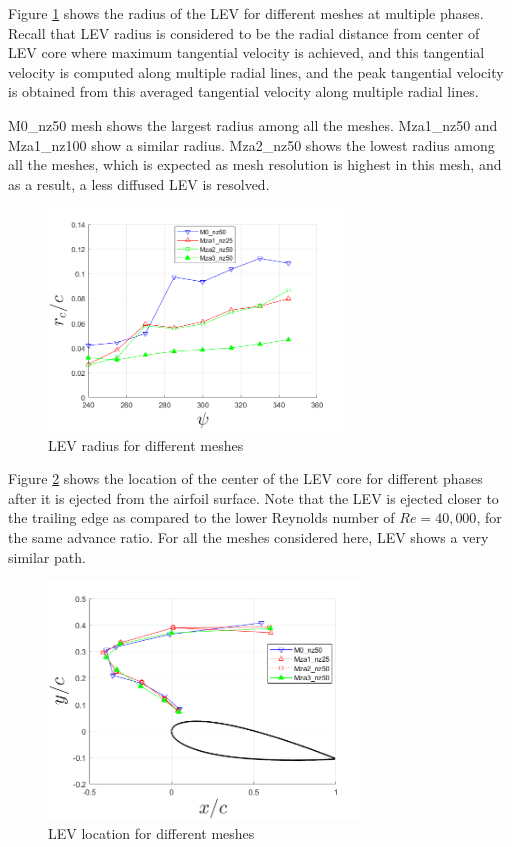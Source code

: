 Figure \ref{fig:zonal_LEV_radius_Re200k} shows the radius of the LEV for different meshes at multiple phases.
Recall that LEV radius is considered to be
the radial distance from center of LEV core where maximum tangential velocity is achieved, and this tangential velocity is computed along multiple radial lines, and the peak tangential
velocity is obtained from this averaged tangential velocity along multiple radial lines.

M0\_nz50 mesh shows the largest radius among all the meshes. Mza1\_nz50 and Mza1\_nz100 show a similar radius.
Mza2\_nz50 shows the lowest radius among all the meshes, which is expected as mesh resolution is highest in this mesh, and as a result, a less diffused LEV is resolved.


\begin{figure}[H]
	\centering
	\includegraphics[width=0.7\textwidth]{figures/zonal_adapt_results/LEV_Re200k/LEV_radius_vp}
	\caption{ LEV radius for different meshes}
	\label{fig:zonal_LEV_radius_Re200k}
\end{figure}

Figure \ref{fig:zonal_LEV_location_Re200k} shows the location of the center of the LEV core for different phases after it is ejected from the airfoil surface.
Note that the LEV is ejected closer to the trailing edge as compared to the lower Reynolds number of $Re=40,000$, for the same advance ratio.
For all the meshes considered here, LEV shows a very similar path.

\begin{figure}[H]
	\centering
	\includegraphics[width=0.75\textwidth]{figures/zonal_adapt_results/LEV_Re200k/LEV_location_Re200k}
	\caption{ LEV location for different meshes}
	\label{fig:zonal_LEV_location_Re200k}
\end{figure}


